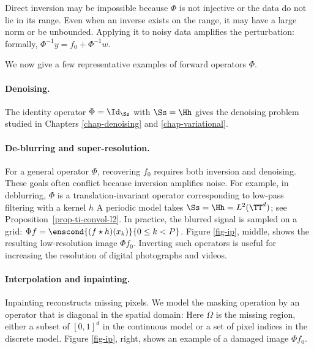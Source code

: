 Direct inversion may be impossible because $\Phi$ is not injective or the data do not lie in its range. Even when an inverse exists on the range, it may have a large norm or be unbounded. Applying it to noisy data amplifies the perturbation: formally, $\Phi^{-1}y=f_0+\Phi^{-1}w$.

We now give a few representative examples of forward operators $\Phi$.

\paragraph{Denoising.}

The identity operator $\Phi=\Id_\Ss$ with $\Ss=\Hh$ gives the denoising problem studied in Chapters \ref{chap-denoising} and \ref{chap-variational}.

\paragraph{De-blurring and super-resolution.}

For a general operator $\Phi$, recovering $f_0$ requires both inversion and denoising. These goals often conflict because inversion amplifies noise.
%
For example, in deblurring, $\Phi$ is a translation-invariant operator corresponding to low-pass filtering with a kernel $h$
A periodic model takes $\Ss=\Hh=L^2(\TT^d)$; see Proposition~\ref{prop-ti-convol-l2}.
%
In practice, the blurred signal is sampled on a grid: $\Phi f = \enscond{(f \star h)(x_k)}{0 \leq k< P}$. Figure \ref{fig-ip}, middle, shows the resulting low-resolution image $\Phi f_0$.
%
Inverting such operators is useful for increasing the resolution of digital photographs and videos.


\paragraph{Interpolation and inpainting.}

Inpainting reconstructs missing pixels. We model the masking operation by an operator that is diagonal in the spatial domain:
Here $\Omega$ is the missing region, either a subset of $[0,1]^d$ in the continuous model or a set of pixel indices in the discrete model.
%
Figure \ref{fig-ip}, right, shows an example of a damaged image $\Phi f_0$.

